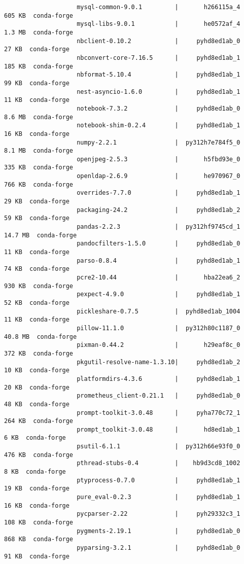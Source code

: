 \documentclass{article}
\begin{document}
\begin{enumerate}
\begin{itemize}
\begin{itemize}
\begin{itemize}
\begin{verbatim}
					mysql-common-9.0.1         |       h266115a_4         605 KB  conda-forge
					mysql-libs-9.0.1           |       he0572af_4         1.3 MB  conda-forge
					nbclient-0.10.2            |     pyhd8ed1ab_0          27 KB  conda-forge
					nbconvert-core-7.16.5      |     pyhd8ed1ab_1         185 KB  conda-forge
					nbformat-5.10.4            |     pyhd8ed1ab_1          99 KB  conda-forge
					nest-asyncio-1.6.0         |     pyhd8ed1ab_1          11 KB  conda-forge
					notebook-7.3.2             |     pyhd8ed1ab_0         8.6 MB  conda-forge
					notebook-shim-0.2.4        |     pyhd8ed1ab_1          16 KB  conda-forge
					numpy-2.2.1                |  py312h7e784f5_0         8.1 MB  conda-forge
					openjpeg-2.5.3             |       h5fbd93e_0         335 KB  conda-forge
					openldap-2.6.9             |       he970967_0         766 KB  conda-forge
					overrides-7.7.0            |     pyhd8ed1ab_1          29 KB  conda-forge
					packaging-24.2             |     pyhd8ed1ab_2          59 KB  conda-forge
					pandas-2.2.3               |  py312hf9745cd_1        14.7 MB  conda-forge
					pandocfilters-1.5.0        |     pyhd8ed1ab_0          11 KB  conda-forge
					parso-0.8.4                |     pyhd8ed1ab_1          74 KB  conda-forge
					pcre2-10.44                |       hba22ea6_2         930 KB  conda-forge
					pexpect-4.9.0              |     pyhd8ed1ab_1          52 KB  conda-forge
					pickleshare-0.7.5          |  pyhd8ed1ab_1004          11 KB  conda-forge
					pillow-11.1.0              |  py312h80c1187_0        40.8 MB  conda-forge
					pixman-0.44.2              |       h29eaf8c_0         372 KB  conda-forge
					pkgutil-resolve-name-1.3.10|     pyhd8ed1ab_2          10 KB  conda-forge
					platformdirs-4.3.6         |     pyhd8ed1ab_1          20 KB  conda-forge
					prometheus_client-0.21.1   |     pyhd8ed1ab_0          48 KB  conda-forge
					prompt-toolkit-3.0.48      |     pyha770c72_1         264 KB  conda-forge
					prompt_toolkit-3.0.48      |       hd8ed1ab_1           6 KB  conda-forge
					psutil-6.1.1               |  py312h66e93f0_0         476 KB  conda-forge
					pthread-stubs-0.4          |    hb9d3cd8_1002           8 KB  conda-forge
					ptyprocess-0.7.0           |     pyhd8ed1ab_1          19 KB  conda-forge
					pure_eval-0.2.3            |     pyhd8ed1ab_1          16 KB  conda-forge
					pycparser-2.22             |     pyh29332c3_1         108 KB  conda-forge
					pygments-2.19.1            |     pyhd8ed1ab_0         868 KB  conda-forge
					pyparsing-3.2.1            |     pyhd8ed1ab_0          91 KB  conda-forge

\end{verbatim}
\end{itemize}
\end{itemize}
\end{itemize}
\end{enumerate}
\end{document}
